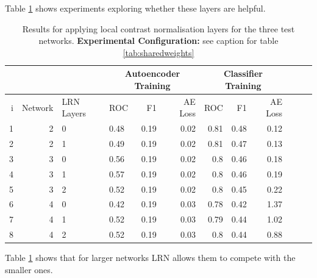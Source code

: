       Table \ref{tab:lrn} shows experiments exploring whether these layers are helpful.
      \begin{table}[!h] \centering
      {\small
      \begin{tabular}{rrllrrrrrrrr}
        &&&   \multicolumn{3}{|c|}{Autoencoder Training} &  \multicolumn{3}{c|}{Classifier Training}    \\
      \hline
        i & Network             & LRN Layers   &    ROC&F1&AE Loss & ROC & F1 & AE Loss \\
      \hline
       1 & 2 & 0  &    0.48 &   0.19 &     0.02 &    0.81 &   0.48 &     0.12 \\
       2 & 2 & 1  &    0.49 &   0.19 &     0.02 &    0.81 &   0.47 &     0.13 \\
      \hline
       3 & 3 & 0  &    0.56 &   0.19 &     0.02 &    0.8  &   0.46 &     0.18 \\
       4 & 3 & 1  &    0.57 &   0.19 &     0.02 &    0.8  &   0.46 &     0.19 \\
       5 & 3 & 2  &    0.52 &   0.19 &     0.02 &    0.8  &   0.45 &     0.22 \\
      \hline
       6 & 4 & 0  &    0.42 &   0.19 &     0.03 &    0.78 &   0.42 &     1.37 \\
       7 & 4 & 1  &    0.52 &   0.19 &     0.03 &    0.79 &   0.44 &     1.02 \\
       8 & 4 & 2  &    0.52 &   0.19 &     0.03 &    0.8  &   0.44 &     0.88 \\
      \hline
      \end{tabular}}\caption{Results for applying local contrast normalisation layers
      for the three test networks. {\bf Experimental Configuration:} see caption
      for table \ref{tab:sharedweights}}\label{tab:lrn}  \end{table}

      Table \ref{tab:lrn} shows that for larger networks LRN allows them to compete with
      the smaller ones.

      \newpage
